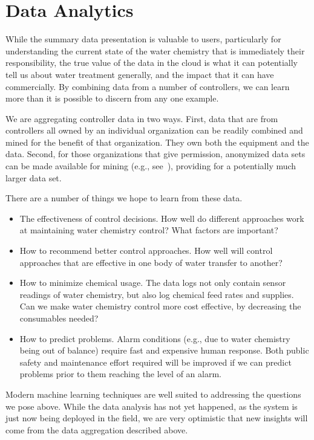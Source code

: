 \section{Data Analytics}
\label{sec:analytics}

While the summary data presentation is valuable to users, particularly for
understanding the current state of the water chemistry that is immediately
their responsibility, the true value of the data in the cloud is what it
can potentially tell us about water treatment generally, and the impact
that it can have commercially.
By combining data from a number of controllers, we can learn more than
it is possible to discern from any one example.

We are aggregating controller data in two ways.  First, data that are
from controllers all owned by an individual organization can be readily
combined and mined for the benefit of that organization.  They own
both the equipment and the data. Second, for those organizations that
give permission, anonymized data sets can be made available for mining
(e.g., see~\cite{horey2007,zhong2009k}), providing for a potentially
much larger data set.

There are a number of things we hope to learn from these data.
\begin{itemize}
\item The effectiveness of control decisions.  How well do different
approaches work at maintaining water chemistry control?  What factors
are important?
\item How to recommend better control approaches.  How well will control
approaches that are effective in one body of water transfer to another?
\item How to minimize chemical usage.  The data logs not only contain
sensor readings of water chemistry, but also log chemical feed rates
and supplies.  Can we make water chemistry control more cost effective,
by decreasing the consumables needed?
\item How to predict problems. Alarm conditions (e.g., due to water
chemistry being out of balance) require fast and expensive human response.
Both public safety and maintenance effort required will be improved
if we can predict problems prior to them reaching the level of an alarm.
\end{itemize}

Modern machine learning techniques are well suited to addressing the
questions we pose above.
While the data analysis has not yet happened, as the system is just
now being deployed in the field, we are very optimistic that new insights
will come from the data aggregation described above.

